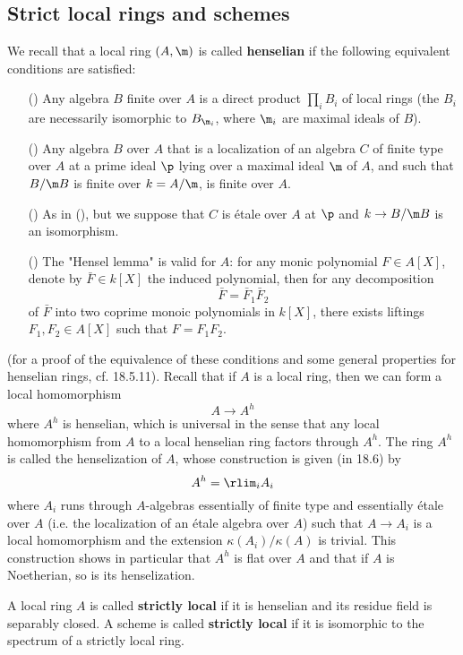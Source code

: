 \subsection{Strict local rings and schemes}
We recall that a local ring $(A,\m)$ is called \textbf{henselian} if the following equivalent conditions are satisfied:
\begin{enumerate}
    \item[(\rmnum{1})] Any algebra $B$ finite over $A$ is a direct product $\prod_iB_i$ of local rings (the $B_i$ are necessarily isomorphic to $B_{\m_i}$, where $\m_i$ are maximal ideals of $B$). 
    \item[(\rmnum{2})] Any algebra $B$ over $A$ that is a localization of an algebra $C$ of finite type over $A$ at a prime ideal $\p$ lying over a maximal ideal $\m$ of $A$, and such that $B/\m B$ is finite over $k=A/\m$, is finite over $A$.
    \item[(\rmnum{3})] As in (), but we suppose that $C$ is \'etale over $A$ at $\p$ and $k\to B/\m B$ is an isomorphism.
    \item[(\rmnum{4})] The "Hensel lemma" is valid for $A$: for any monic polynomial $F\in A[X]$, denote by $\bar{F}\in k[X]$ the induced polynomial, then for any decomposition
    \[\bar{F}=\bar{F}_1\bar{F}_2\]
    of $\bar{F}$ into two coprime monoic polynomials in $k[X]$, there exists liftings $F_1,F_2\in A[X]$ such that $F=F_1F_2$.
\end{enumerate}
(for a proof of the equivalence of these conditions and some general properties for henselian rings, cf. \cite{EGA4-4} 18.5.11). Recall that if $A$ is a local ring, then we can form a local homomorphism
\[A\to A^h\]
where $A^h$ is henselian, which is universal in the sense that any local homomorphism from $A$ to a local henselian ring factors through $A^h$. The ring $A^h$ is called the henselization of $A$, whose construction is given (in \cite{EGA4-4} 18.6) by
\[A^h=\rlim_iA_i\]
where $A_i$ runs through $A$-algebras essentially of finite type and essentially \'etale over $A$ (i.e. the localization of an \'etale algebra over $A$) such that $A\to A_i$ is a local homomorphism and the extension $\kappa(A_i)/\kappa(A)$ is trivial. This construction shows in particular that $A^h$ is flat over $A$ and that if $A$ is Noetherian, so is its henselization.\par
A local ring $A$ is called \textbf{strictly local} if it is henselian and its residue field is separably closed. A scheme is called \textbf{strictly local} if it is isomorphic to the spectrum of a strictly local ring.
